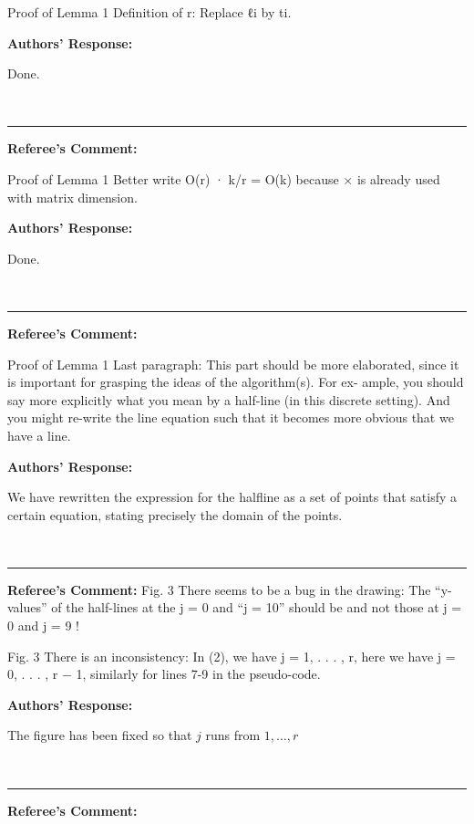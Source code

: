 \documentclass{article}
\begin{document}
Proof of Lemma 1 Definition of r: Replace ℓi by ti.

\noindent\textbf{Authors' Response:}

Done.

\ \ \vspace{2ex}\hrule\vspace{2ex}
\noindent\textbf{Referee's Comment:}

Proof of Lemma 1 Better write O(r) · k/r = O(k) because × is already used
with matrix dimension.

\noindent\textbf{Authors' Response:}

Done.

\ \ \vspace{2ex}\hrule\vspace{2ex}
\noindent\textbf{Referee's Comment:}

Proof of Lemma 1 Last paragraph: This part should be more elaborated,
since it is important for grasping the ideas of the algorithm(s). For ex-
ample, you should say more explicitly what you mean by a half-line (in
this discrete setting). And you might re-write the line equation such that
it becomes more obvious that we have a line.

\noindent\textbf{Authors' Response:}

We have rewritten the expression for the halfline as a set of points
that satisfy a certain equation, stating precisely the domain of the
points.

\ \ \vspace{2ex}\hrule\vspace{2ex}
\noindent\textbf{Referee's Comment:}
Fig. 3 There seems to be a bug in the drawing: The “y-values” of the half-lines
at the j = 0 and “j = 10” should be and not those at j = 0 and j = 9 !

Fig. 3 There is an inconsistency: In (2), we have j = 1, . . . , r, here we have
j = 0, . . . , r − 1, similarly for lines 7-9 in the pseudo-code.

\noindent\textbf{Authors' Response:}

The figure has been fixed so that $j$ runs from $1,\ldots,r$

\ \ \vspace{2ex}\hrule\vspace{2ex}
\noindent\textbf{Referee's Comment:}
\end{document}
